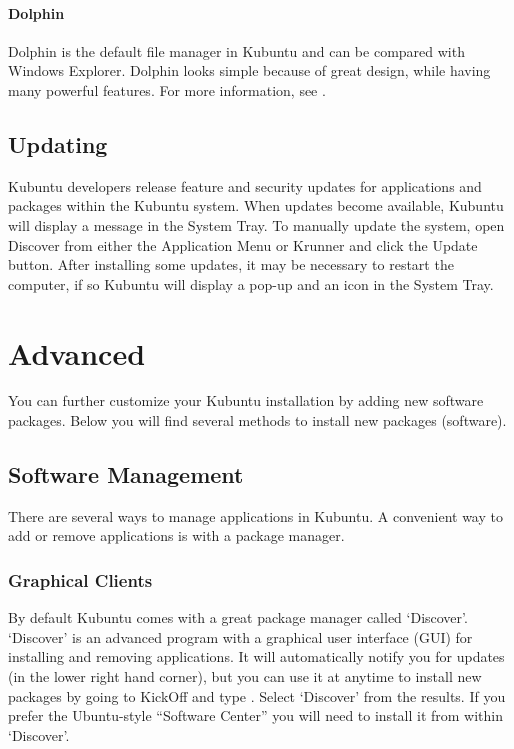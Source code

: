 \documentclass[letterpaper,10pt,english]{sphinxmanual}
\begin{document}
\subsubsection{Dolphin}
\label{\detokenize{docs/basic:dolphin}}
Dolphin is the default file manager in Kubuntu and can be compared with Windows Explorer. Dolphin looks simple because of great design, while having many powerful features. For more information, see .


\section{Updating}
\label{\detokenize{docs/basic:updating}}
Kubuntu developers release feature and security updates for applications and packages within the Kubuntu system. When updates become available, Kubuntu will display a message in the System Tray. To manually update the system, open Discover from either the Application Menu or Krunner and click the Update button. After installing some updates, it may be necessary to restart the computer, if so Kubuntu will display a pop-up and an icon in the System Tray.

{\hyperref[\detokenize{docs/basic:basic}]{}}


\chapter{Advanced}
\label{\detokenize{docs/advanced:advanced}}\label{\detokenize{docs/advanced:advanced-link}}\label{\detokenize{docs/advanced::doc}}
You can further customize your Kubuntu installation by adding new software packages. Below you will find several methods to install new packages (software).


\section{Software Management}
\label{\detokenize{docs/advanced:software-management}}
There are several ways to manage applications in Kubuntu. A convenient way to add or remove applications is with a package manager.


\subsection{Graphical Clients}
\label{\detokenize{docs/advanced:graphical-clients}}
By default Kubuntu comes with a great package manager called ‘Discover’. ‘Discover’ is an advanced program with a graphical user interface (GUI) for installing and removing applications. It will automatically notify you for updates (in the lower right hand corner), but you can use it at anytime to install new packages by going to KickOff and type . Select ‘Discover’ from the results. If you prefer the Ubuntu-style “Software Center” you will need to install it from within ‘Discover’.
\end{document}
